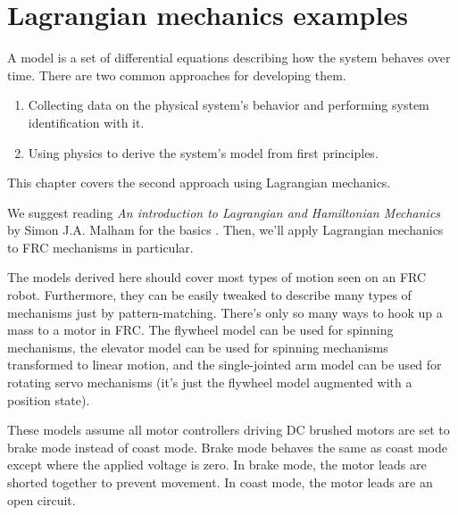 
\chapter{Lagrangian mechanics examples}

A \gls{model} is a set of differential equations describing how the \gls{system}
behaves over time. There are two common approaches for developing them.
\begin{enumerate}
  \item Collecting data on the physical system's behavior and performing
    \gls{system} identification with it.
  \item Using physics to derive the \gls{system}'s model from first principles.
\end{enumerate}

This chapter covers the second approach using Lagrangian mechanics.

We suggest reading \textit{An introduction to Lagrangian and Hamiltonian
Mechanics} by Simon J.A. Malham for the basics
\cite{bib:an_intro_to_lagrangian_and_hamiltonian_mechanics}. Then, we'll apply
Lagrangian mechanics to FRC mechanisms in particular.

The \glspl{model} derived here should cover most types of motion seen on an FRC
robot. Furthermore, they can be easily tweaked to describe many types of
mechanisms just by pattern-matching. There's only so many ways to hook up a mass
to a motor in FRC. The flywheel \gls{model} can be used for spinning mechanisms,
the elevator \gls{model} can be used for spinning mechanisms transformed to
linear motion, and the single-jointed arm \gls{model} can be used for rotating
servo mechanisms (it's just the flywheel \gls{model} augmented with a position
\gls{state}).

These \glspl{model} assume all motor controllers driving DC brushed motors are
set to brake mode instead of coast mode. Brake mode behaves the same as coast
mode except where the applied voltage is zero. In brake mode, the motor leads
are shorted together to prevent movement. In coast mode, the motor leads are an
open circuit.

\renewcommand*{\chapterpath}{\partpath/lagrangian-mechanics-examples}


